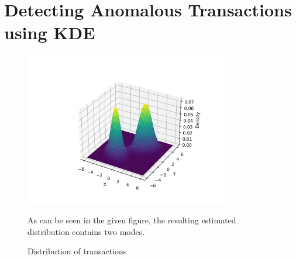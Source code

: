 \section{Detecting Anomalous Transactions using KDE}
\begin{figure}[H]
	\centering
	\includegraphics[width=0.8\textwidth]{../images/transaction_distribution.jpg}
	\caption{Distribution of transactions}

	As can be seen in the given figure, the resulting estimated
	distribution contains two modes.
\end{figure}
